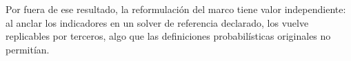 \documentclass[11pt,a4paper]{article}
\theoremstyle{definition}
\theoremstyle{plain}
\theoremstyle{remark}
\begin{document}
Por fuera de ese resultado, la reformulación del marco tiene valor independiente:
al anclar los indicadores en un solver de referencia declarado, los vuelve
replicables por terceros, algo que las definiciones probabilísticas originales no
permitían.



\end{document}
